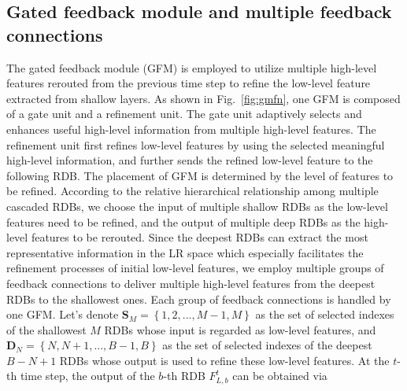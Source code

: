 \documentclass{bmvc2k}
\begin{document}
\subsection{Gated feedback module and multiple feedback connections}
\label{sec:gfm}
The gated feedback module (GFM) is employed to utilize multiple high-level features rerouted from the previous time step to refine the low-level feature extracted from shallow layers. As shown in Fig.~\ref{fig:gmfn}, one GFM is composed of a gate unit and a refinement unit. The gate unit adaptively selects and enhances useful high-level information from multiple high-level features. The refinement unit first refines low-level features by using the selected meaningful high-level information, and further sends the refined low-level feature to the following RDB.
The placement of GFM is determined by the level of features to be refined. According to the relative hierarchical relationship among multiple cascaded RDBs, we choose the input of multiple shallow RDBs as the low-level features need to be refined, and the output of multiple deep RDBs as the high-level features to be rerouted. Since the deepest RDBs can extract the most representative information in the LR space which especially facilitates the refinement processes of initial low-level features, we employ multiple groups of feedback connections to deliver multiple high-level features from the deepest RDBs to the shallowest ones. Each group of feedback connections is handled by one GFM. Let's denote $\mathbf{S}_{M}=\left \{1,2,...,M-1,M\right \}$ as the set of selected indexes of the shallowest $M$ RDBs whose input is regarded as low-level features, and $\mathbf{D}_{N}=\left \{N,N+1,...,B-1,B\right \}$ as the set of selected indexes of the deepest $B-N+1$ RDBs whose output is used to refine these low-level features. At the $t$-th time step, the output of the $b$-th RDB $F_{L,b}^{t}$ can be obtained via
\end{document}
